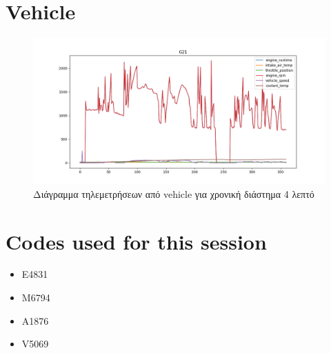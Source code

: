 \documentclass{article}
\begin{document}
\section{Vehicle}

\begin{figure}[H]
  \begin{center}
    \includegraphics[width=\textwidth]{G21.png}
  \end{center}
  \caption{Διάγραμμα τηλεμετρήσεων από vehicle για χρονική διάστημα 4 λεπτό}
\end{figure}

\section{Codes used for this session}
\begin{itemize}
  \item E4831
  \item M6794
  \item A1876
  \item V5069
\end{itemize}
\end{document}
